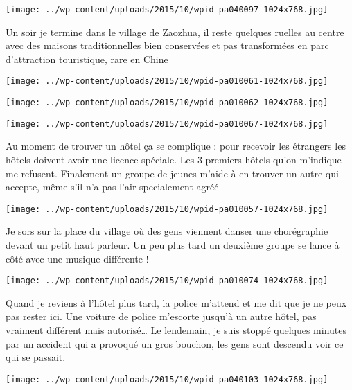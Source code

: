 \centerline{\texttt{[image: ../wp-content/uploads/2015/10/wpid-pa040097-1024x768.jpg]} } 
 \newline
 Un soir je termine dans le village de Zaozhua, il reste quelques ruelles au centre avec des maisons traditionnelles bien conservées et pas transformées en parc d'attraction touristique, rare en Chine \newline
 \newline
\centerline{\texttt{[image: ../wp-content/uploads/2015/10/wpid-pa010061-1024x768.jpg]} } 
 \newline
 \newline
\centerline{\texttt{[image: ../wp-content/uploads/2015/10/wpid-pa010062-1024x768.jpg]} } 
 \newline
 \newline
\centerline{\texttt{[image: ../wp-content/uploads/2015/10/wpid-pa010067-1024x768.jpg]} } 
 \newline
 Au moment de trouver un hôtel ça se complique : pour recevoir les étrangers les hôtels doivent avoir une licence spéciale. Les 3 premiers hôtels qu'on m'indique me refusent. \newline
 Finalement un groupe de jeunes m'aide à en trouver un autre qui accepte, même s'il n'a pas l'air specialement agréé \newline
 \newline
\centerline{\texttt{[image: ../wp-content/uploads/2015/10/wpid-pa010057-1024x768.jpg]} } 
 \newline
 Je sors sur la place du village où des gens viennent danser une chorégraphie devant un petit haut parleur. Un peu plus tard un deuxième groupe se lance à côté avec une musique différente ! \newline
 \newline
\centerline{\texttt{[image: ../wp-content/uploads/2015/10/wpid-pa010074-1024x768.jpg]} } 
 \newline
 Quand je reviens à l'hôtel plus tard, la police m'attend et me dit que je ne peux pas rester ici. Une voiture de police m'escorte jusqu'à un autre hôtel, pas vraiment différent mais autorisé… \newline
 Le lendemain, je suis stoppé quelques minutes par un accident qui a provoqué un gros bouchon, les gens sont descendu voir ce qui se passait. \newline
 \newline
\centerline{\texttt{[image: ../wp-content/uploads/2015/10/wpid-pa040103-1024x768.jpg]} } 
